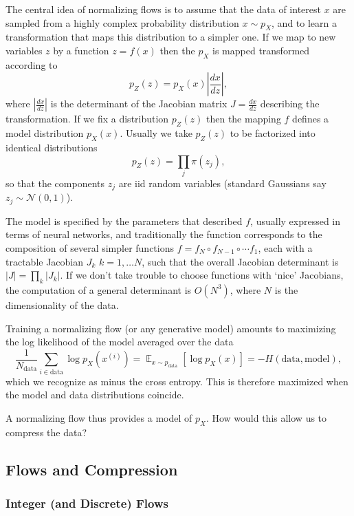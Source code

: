 \documentclass[preprint,notitlepage]{revtex4-1}
\newcommand*{\cN}{{\mathcal N}}
\DeclareMathOperator*{\E}{\mathbb{E}}
\begin{document}
The central idea of normalizing flows is to assume that the data of interest $x$ are sampled from a highly complex probability distribution $x\sim p_X$, and to learn a transformation that maps this distribution to a simpler one. If we map to new variables $z$ by a function $z=f(x)$ then the $p_X$ is mapped transformed according to
%
\begin{equation}
  p_Z(z) = p_X(x)\left|\frac{dx}{dz}\right|,
\end{equation}
%
where $\left|\frac{dx}{dz}\right|$ is the determinant of the Jacobian matrix $J=\frac{dx}{dz}$ describing the transformation. If we fix a distribution $p_Z(z)$ then the mapping $f$ defines a model distribution $p_X(x)$. Usually we take $p_Z(z)$ to be factorized into identical distributions
%
\begin{equation}
  p_Z(z) = \prod_j \pi(z_j),
\end{equation}
%
so that the components $z_j$ are iid random variables (standard Gaussians say $z_j\sim \cN(0,1)$).

The model is specified by the parameters that described $f$, usually expressed in terms of neural networks, and traditionally the function corresponds to the composition of several simpler functions $f=f_N\circ f_{N-1}\circ \cdots f_1$, each with a tractable Jacobian $J_k$ $k=1,\ldots N$, such that the overall Jacobian determinant is $|J|=\prod_k |J_k|$. If we don't take trouble to choose functions with `nice' Jacobians, the computation of a general determinant is $O(N^3)$, where $N$ is the dimensionality of the data.

Training a normalizing flow (or any generative model) amounts to maximizing the log likelihood of the model averaged over the data
%
\begin{equation}\label{eq:cross}
  \frac{1}{N_\text{data}}\sum_{i\in \text{data}} \log p_X(x^{(i)})=\E_{x\sim p_\text{data}}\left[\log p_X(x)\right]= -H(\text{data}, \text{model}),
\end{equation}
%
which we recognize as minus the cross entropy. This is therefore maximized when the model and data distributions coincide.

A normalizing flow thus provides a model of $p_X$. How would this allow us to compress the data?

\subsection{Flows and Compression}

\subsubsection{Integer (and Discrete) Flows}
\end{document}
